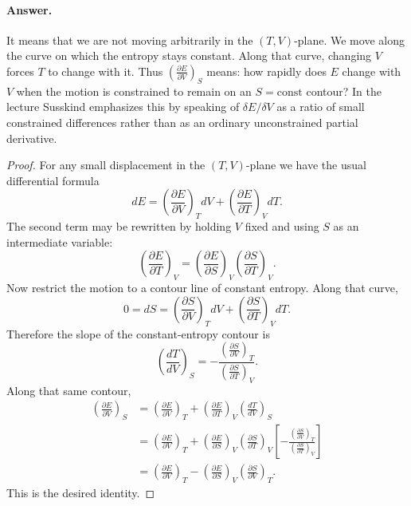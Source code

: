 \paragraph{Answer.} It means that we are not moving arbitrarily in the \((T,V)\)-plane. We move along the curve on which the entropy stays constant. Along that curve, changing \(V\) forces \(T\) to change with it. Thus \(\left(\frac{\partial E}{\partial V}\right)_S\) means: how rapidly does \(E\) change with \(V\) when the motion is constrained to remain on an \(S=\mathrm{const}\) contour? In the lecture Susskind emphasizes this by speaking of \(\delta E/\delta V\) as a ratio of small constrained differences rather than as an ordinary unconstrained partial derivative.

\begin{proof}
For any small displacement in the \((T,V)\)-plane we have the usual differential formula
\begin{equation}
dE
=
\left(\frac{\partial E}{\partial V}\right)_T dV
+
\left(\frac{\partial E}{\partial T}\right)_V dT.
\end{equation}
The second term may be rewritten by holding \(V\) fixed and using \(S\) as an intermediate variable:
\begin{equation}
\left(\frac{\partial E}{\partial T}\right)_V
=
\left(\frac{\partial E}{\partial S}\right)_V
\left(\frac{\partial S}{\partial T}\right)_V.
\end{equation}
Now restrict the motion to a contour line of constant entropy. Along that curve,
\begin{equation}
0 = dS
=
\left(\frac{\partial S}{\partial V}\right)_T dV
+
\left(\frac{\partial S}{\partial T}\right)_V dT.
\end{equation}
Therefore the slope of the constant-entropy contour is
\begin{equation}
\left(\frac{dT}{dV}\right)_S
=
-
\frac{\left(\frac{\partial S}{\partial V}\right)_T}
{\left(\frac{\partial S}{\partial T}\right)_V}.
\end{equation}
Along that same contour,
\begin{align}
\left(\frac{\partial E}{\partial V}\right)_S
&=
\left(\frac{\partial E}{\partial V}\right)_T
+
\left(\frac{\partial E}{\partial T}\right)_V
\left(\frac{dT}{dV}\right)_S \\
&=
\left(\frac{\partial E}{\partial V}\right)_T
+
\left(\frac{\partial E}{\partial S}\right)_V
\left(\frac{\partial S}{\partial T}\right)_V
\left[
-
\frac{\left(\frac{\partial S}{\partial V}\right)_T}
{\left(\frac{\partial S}{\partial T}\right)_V}
\right] \\
&=
\left(\frac{\partial E}{\partial V}\right)_T
-
\left(\frac{\partial E}{\partial S}\right)_V
\left(\frac{\partial S}{\partial V}\right)_T.
\end{align}
This is the desired identity.
\end{proof}

